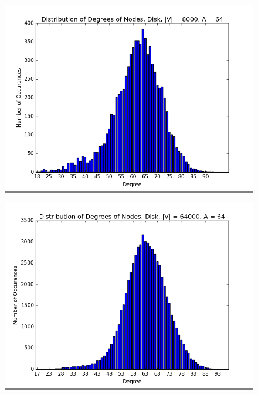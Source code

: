 \documentclass{article}
\begin{document}
\begin{figure}
    \begin{minipage}{0.45\textwidth}
    \colorbox{gray}{\includegraphics[width=\linewidth]{./graphs/hist_deg_disk_0.png}}
    \end{minipage}
    \hspace{\fill}
    \begin{minipage}{0.45\textwidth}
    \colorbox{gray}{\includegraphics[width=\linewidth]{./graphs/hist_deg_disk_1.png}}
    \end{minipage}
    \vskip 0.25in
    \begin{minipage}{0.45\textwidth}

\end{minipage}
\end{figure}
\end{document}
